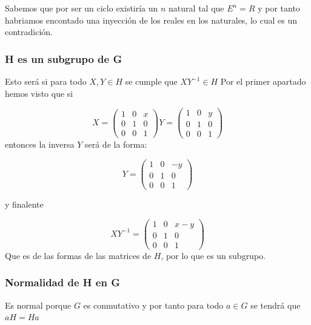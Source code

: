 \documentclass[12pt]{article}
\begin{document}
Sabemos que por ser un ciclo existiría un $n$ natural tal que $E^n = R$
y por tanto habriamos encontado una inyección de los reales en los naturales, lo cual
es un contradición. 

\subsubsection*{H es un subgrupo de G}
Esto será si para todo $X,Y \in H$ se cumple que $X Y^{-1} \in H$
Por el primer apartado hemos visto que si 

\begin{equation*}
    X = 
    \begin{pmatrix}
        1 & 0 & x \\
        0 & 1 & 0 \\
        0 & 0 & 1
    \end{pmatrix}
    Y = 
    \begin{pmatrix}
        1 & 0 & y \\
        0 & 1 & 0 \\
        0 & 0 & 1
    \end{pmatrix}
\end{equation*}
entonces la inversa $Y$ será de la forma: 

\begin{equation*}
    Y = 
    \begin{pmatrix}
        1 & 0 & -y \\
        0 & 1 & 0 \\
        0 & 0 & 1
    \end{pmatrix}
\end{equation*}

y finalente

\begin{equation*}
    XY^{-1} = 
    \begin{pmatrix}
        1 & 0 & x-y \\
        0 & 1 & 0 \\
        0 & 0 & 1
    \end{pmatrix}
\end{equation*}
Que es de las formas de las matrices de $H$, por lo que es un subgrupo.

\subsubsection*{Normalidad de H en G}

Es normal porque $G$ es conmutativo y por tanto 
para todo $a \in G$ se tendrá que $aH = Ha$
\end{document}
